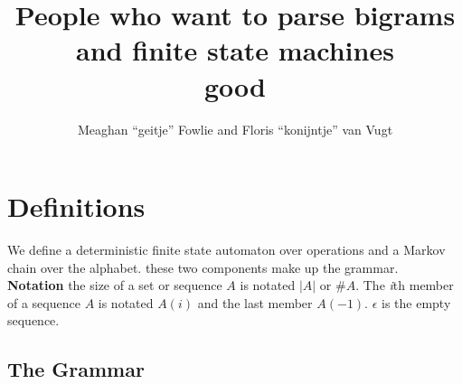 \documentclass[12pt]{article}
\title{People who want to parse bigrams and finite state machines\\good}
\author{Meaghan ``geitje'' Fowlie and Floris ``konijntje'' van Vugt}
\theoremstyle{definition}
\begin{document}
\maketitle

\section{Definitions}



\newcommand\STATES{\ensuremath{\mathbb{S}}}
\newcommand\OPS{\ensuremath{\mathbb{O}}}
\newcommand\BIGR{\ensuremath{\mathbb{B}}}
\newcommand\FSA{\textsc{FSA}}
\newcommand\PARSES{\ensuremath{\mathbb{P}}}
\newcommand\SC{\text{\textsc{sc}}}
\newcommand\TC{\text{\textsc{tc}}}
\newcommand\UC{\text{\textsc{uc}}}
\newcommand\BC{\text{\textsc{bc}}}
\newcommand\N{\ensuremath{\mathbb{N}}}
\newcommand\sg{\ensuremath{\Sigma}}
\newcommand\la{\ensuremath{\langle}}
\newcommand\ra{\ensuremath{\rangle}}
\newcommand\arr{\ensuremath{\rightarrow}}
\newcommand\emp{\ensuremath{\epsilon}}
\newcommand\op{\text{\textsl{op}}}
\newcommand\mg{\text{\textsl{mg}}}
\newcommand\cp{\text{\textsl{copy}}}
\newcommand\cl{\text{\textsl{clear}}}
\newcommand\ed{\text{\textsl{end}}}
\newcommand\expr{\text{\textsl{expr}}}
\newcommand\Lex{\text{\textsl{Lex}}}
\newcommand\fea[1]{\text{\texttt{#1}}}
\newcommand\LBOUND{\ensuremath{\rtimes}}
\newcommand\RBOUND{\ensuremath{\ltimes}}
\newcommand\OURG{\text{\textsc{cath}}}


\newcommand\llb{\ensuremath{\llbracket}}
\newcommand\rrb{\ensuremath{\rrbracket}}


\newcommand\der{\leftarrow}


We define a deterministic finite state automaton over operations and a Markov chain over the alphabet. these two components make up the grammar. \\

\noindent\textbf{Notation} the size of a set or sequence $A$ is notated $|A|$ or $\#A$. The \textit{i}th member of a sequence $A$ is notated $A(i)$ and the last member $A(-1)$. $\epsilon$ is the empty sequence.


\subsection{The Grammar}
\label{sec:grammar}
\end{document}
